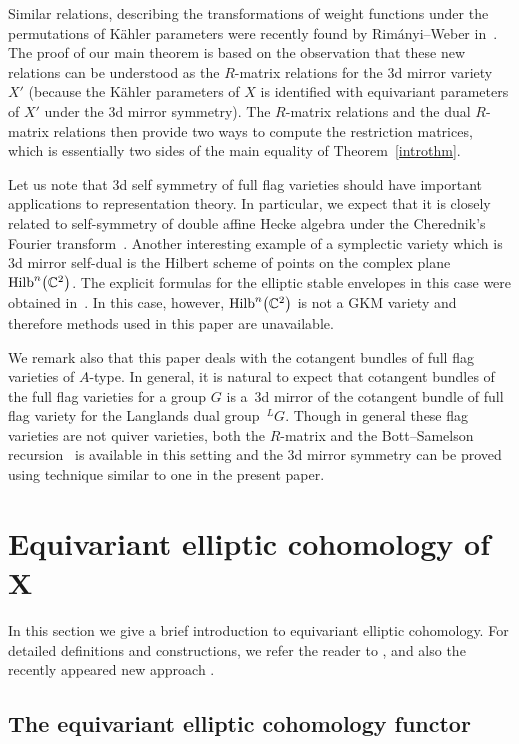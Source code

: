 \documentclass[pdftex]{sigma}
\def\C{{\mathbb C}}
\numberwithin{equation}{section}
\begin{document}
Similar relations, describing the transformations of weight functions under the permutations of K\"ahler parameters were recently found by Rim\'anyi--Weber in~\cite{RW}. The proof of our main theorem is based on the observation that these new relations can be understood as the $R$-matrix relations for the 3d mirror variety $X'$ (because the K\"ahler parameters of $X$ is identified with equivariant parameters of $X'$ under the 3d mirror symmetry). The $R$-matrix relations and the dual $R$-matrix relations then provide two ways to compute the restriction matrices, which is essentially two sides of the main equality of Theorem~\ref{introthm}.

Let us note that 3d self symmetry of full flag varieties should have important applications to representation theory. In particular, we expect that it is closely related to self-symmetry of double affine Hecke algebra under the Cherednik's Fourier transform~\cite{Cher1}. Another interesting example of a symplectic variety which is 3d mirror self-dual is the Hilbert scheme of points on the complex plane ${\rm Hilb}^{n}\big(\C^2\big)$. The explicit formulas for the elliptic stable envelopes in this case were obtained in~\cite{EllHilb}. In this case, however, ${\rm Hilb}^{n}\big(\C^2\big)$ is not a GKM variety and therefore methods used in this paper are unavailable.

We remark also that this paper deals with the cotangent bundles of full flag varieties of $A$-type. In general, it is natural to expect that cotangent bundles of the full flag varieties for a group $G$ is a~3d mirror of the cotangent bundle of full flag variety for the Langlands dual group~$^{L}G$. Though in general these flag varieties are not quiver varieties, both the $R$-matrix and the Bott--Samelson recursion~\cite{RW} is available in this setting and the 3d mirror symmetry can be proved using technique similar to one in the present paper.

\section[Equivariant elliptic cohomology of $X$]{Equivariant elliptic cohomology of $\boldsymbol{X}$}

In this section we give a brief introduction to equivariant elliptic cohomology. For detailed definitions and constructions, we refer the reader to \cite{ell1,ell2,ell3,ell4,ell5,ell6}, and also the recently appeared new approach \cite{BT}.

\subsection{The equivariant elliptic cohomology functor}
\end{document}
